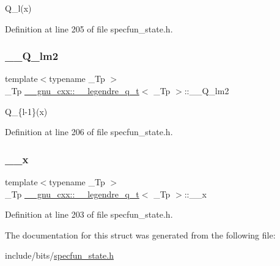 Q\+\_\+l(x) 



Definition at line 205 of file specfun\+\_\+state.\+h.

\mbox{\label{struct____gnu__cxx_1_1____legendre__q__t_afad3335efa2e35e0899a04c4fc23be21}} 
\subsubsection{\texorpdfstring{\+\_\+\+\_\+\+Q\+\_\+lm2}{\_\_Q\_lm2}}
{\footnotesize\ttfamily template$<$typename \+\_\+\+Tp $>$ \\
\+\_\+\+Tp \hyperlink{struct____gnu__cxx_1_1____legendre__q__t}{\+\_\+\+\_\+gnu\+\_\+cxx\+::\+\_\+\+\_\+legendre\+\_\+q\+\_\+t}$<$ \+\_\+\+Tp $>$\+::\+\_\+\+\_\+\+Q\+\_\+lm2}



Q\+\_\+\{l-\/1\}(x) 



Definition at line 206 of file specfun\+\_\+state.\+h.

\mbox{\label{struct____gnu__cxx_1_1____legendre__q__t_ab7913b1164f55ba47441d69dfbdd845b}} 
\subsubsection{\texorpdfstring{\+\_\+\+\_\+x}{\_\_x}}
{\footnotesize\ttfamily template$<$typename \+\_\+\+Tp $>$ \\
\+\_\+\+Tp \hyperlink{struct____gnu__cxx_1_1____legendre__q__t}{\+\_\+\+\_\+gnu\+\_\+cxx\+::\+\_\+\+\_\+legendre\+\_\+q\+\_\+t}$<$ \+\_\+\+Tp $>$\+::\+\_\+\+\_\+x}



Definition at line 203 of file specfun\+\_\+state.\+h.



The documentation for this struct was generated from the following file\+:\begin{DoxyCompactItemize}
\item 
include/bits/\hyperlink{specfun__state_8h}{specfun\+\_\+state.\+h}\end{DoxyCompactItemize}
